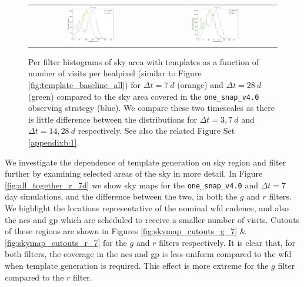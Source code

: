 \documentclass[preprintm,linenumbers]{aastex631}
\newcommand{\baseline}{\texttt{one\_snap\_v4.0}\xspace}
\begin{document}
\begin{figure}
\begin{tabular}{c c}
				\includegraphics[width=0.4\textwidth]{results/histograms/hist_first_year_one_snap_v4_0_10yrs_db_noDD_noTwi_CountMetric_doAllTemplateMetrics_reduceCount_z_noDD_noTwi.pdf} &
				\includegraphics[width=0.4\textwidth]{results/histograms/hist_first_year_one_snap_v4_0_10yrs_db_noDD_noTwi_CountMetric_doAllTemplateMetrics_reduceCount_y_noDD_noTwi.pdf} \\
			\end{tabular}
			\caption{
				Per filter histograms of sky area with templates as a function of number of visits per healpixel (similar to Figure \ref{fig:template_baseline_all}) for $\Delta t = 7\ \si{d}$ (orange) and $\Delta t = 28\ \si{d}$ (green) compared to the sky area covered in the \baseline observing strategy (blue).
    We compare these two timescales as there is little difference between the distributions for $\Delta t = 3, 7\ \si{d}$ and $\Delta t = 14, 28\ \si{d}$ respectively.
   See also the related Figure Set \ref{appendixb:1}.
			}
			\label{fig:template_baseline_histograms7_28d}
		\end{figure}


We investigate the dependence of template generation on sky region and filter further by examining selected areas of the sky in more detail.
In Figure \ref{fig:all_together_r_7d} we show sky maps for the \baseline and $\Delta t  =7$ day simulations, and the difference between the two, in both the $g$ and $r$ filters. 
We highlight the locations representative of the nominal \gls*{wfd} cadence, and also the \gls*{nes} and \gls*{gp} which are scheduled to receive a smaller number of visits.
Cutouts of these regions are shown in Figures \ref{fig:skymap_cutouts_g_7} \& \ref{fig:skymap_cutouts_r_7} for the $g$ and $r$ filters respectively.
It is clear that, for both filters, the coverage in the \gls*{nes} and \gls*{gp} is less-uniform compared to the \gls*{wfd} when template generation is required.
This effect is more extreme for the $g$ filter compared to the $r$ filter.
\end{document}
